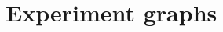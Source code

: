 \documentclass[twoside]{ctuthesis}
\theoremstyle{plain}
\theoremstyle{definition}
\theoremstyle{note}
\begin{document}







\appendix
\chapter{Experiment graphs}
\label{sec:appendix}

%
%	
\end{document}
